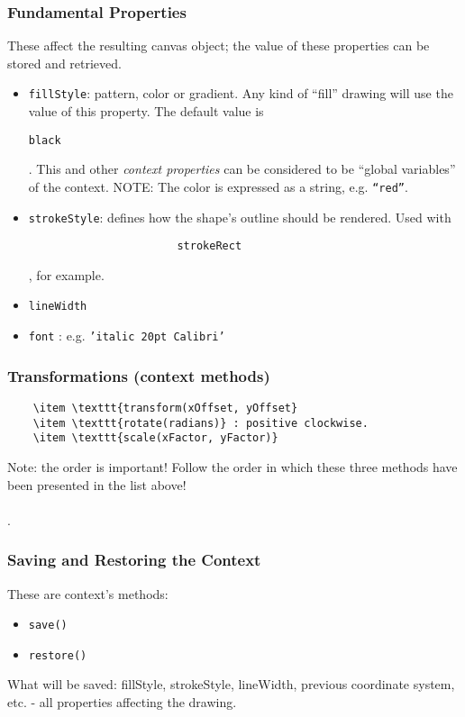 \documentclass[a4paper,11pt]{book}
\begin{document}
	\subsubsection{Fundamental Properties}
	These affect the resulting canvas object; the value of these properties can be stored and
	retrieved.
	\begin{itemize}
	\item \texttt{fillStyle}: pattern, color or gradient. Any kind of ``fill'' drawing will use the value
					 of this property. The default value is \begin{verbatim}black\end{verbatim}.
					 This and other \emph{context properties} can be considered to be
					 ``global variables'' of the context. NOTE: The color is expressed as a string, e.g.
					 \texttt{``red''}.
	\item \texttt{strokeStyle}: defines how the shape's outline should be rendered. Used with \begin{verbatim}
					   strokeRect\end{verbatim}, for example.
	\item \texttt{lineWidth}
	\item \texttt{font} : e.g. \texttt{'italic 20pt Calibri'}
	\end{itemize}
	
	\subsubsection{Transformations (context methods)}
	\begin{verbatim}
	\item \texttt{transform(xOffset, yOffset}
	\item \texttt{rotate(radians)} : positive clockwise.
	\item \texttt{scale(xFactor, yFactor)}
	\end{verbatim}
	Note: the order is important! Follow the order in which these three methods have been presented in the list above!
	\\ \\  .

	\subsubsection{Saving and Restoring the Context}
	These are context's methods:
	\begin{itemize}
	\item \texttt{save()}
	\item \texttt{restore()}
	\end{itemize}
	What will be saved: fillStyle, strokeStyle, lineWidth, previous
	coordinate system, etc. - all properties affecting the drawing.
	
\end{document}
